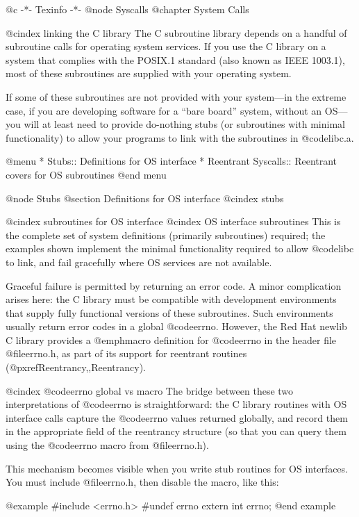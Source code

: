 @c                                           -*- Texinfo -*-
@node Syscalls
@chapter System Calls

@cindex linking the C library
The C subroutine library depends on a handful of subroutine calls for
operating system services.  If you use the C library on a system that
complies with the POSIX.1 standard (also known as IEEE 1003.1), most of
these subroutines are supplied with your operating system.

If some of these subroutines are not provided with your system---in
the extreme case, if you are developing software for a ``bare board''
system, without an OS---you will at least need to provide do-nothing
stubs (or subroutines with minimal functionality) to allow your
programs to link with the subroutines in @code{libc.a}.

@menu
* Stubs::		Definitions for OS interface
* Reentrant Syscalls::	Reentrant covers for OS subroutines
@end menu

@node Stubs
@section Definitions for OS interface
@cindex stubs

@cindex subroutines for OS interface
@cindex OS interface subroutines
This is the complete set of system definitions (primarily subroutines)
required; the examples shown implement the minimal functionality
required to allow @code{libc} to link, and fail gracefully where OS
services are not available.

Graceful failure is permitted by returning an error code.  A minor
complication arises here: the C library must be compatible with
development environments that supply fully functional versions of these
subroutines.  Such environments usually return error codes in a global
@code{errno}.  However, the Red Hat newlib C library provides a @emph{macro}
definition for @code{errno} in the header file @file{errno.h}, as part
of its support for reentrant routines (@pxref{Reentrancy,,Reentrancy}).

@cindex @code{errno} global vs macro
The bridge between these two interpretations of @code{errno} is
straightforward: the C library routines with OS interface calls
capture the @code{errno} values returned globally, and record them in
the appropriate field of the reentrancy structure (so that you can query
them using the @code{errno} macro from @file{errno.h}).

This mechanism becomes visible when you write stub routines for OS
interfaces.   You must include @file{errno.h}, then disable the macro,
like this:

@example
#include <errno.h>
#undef errno
extern int errno;
@end example

